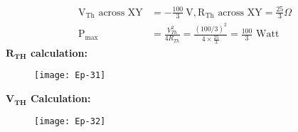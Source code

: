 \begin{enumerate}
\begin{answer}
		\begin{align*}
		\mathrm{V}_{\mathrm{Th}} \text { across } \mathrm{XY}&=-\frac{100}{3} \mathrm{~V}, \mathrm{R}_{\mathrm{Th}} \text { across } \mathrm{XY}=\frac{25}{3} \Omega \\
		\mathrm{P}_{\max }&=\frac{V_{T h}^{2}}{4 R_{T h}}=\frac{(100 / 3)^{2}}{4 \times \frac{25}{3}}=\frac{100}{3} \text { Watt }
		\end{align*}
		\textbf{$\mathbf{R}_{\mathbf{TH}}$ calculation:}
		\begin{figure}[H]
			\centering
			\texttt{[image: Ep-31]}
		\end{figure}
		\textbf{$\mathbf{V}_{\mathbf{TH}}$ Calculation:}
			\begin{figure}[H]
			\centering
			\texttt{[image: Ep-32]}
		\end{figure}
	\end{answer}
\end{enumerate}